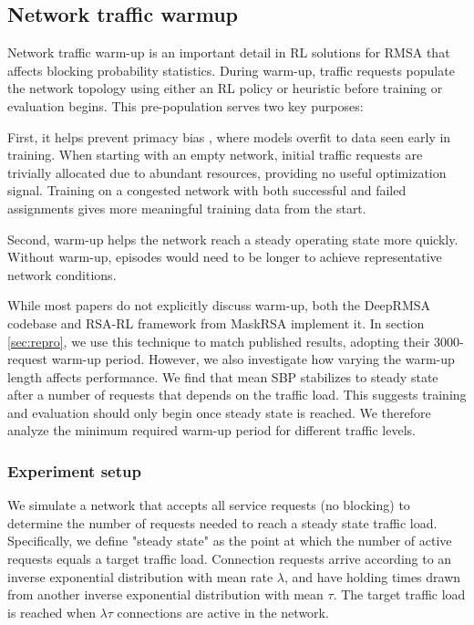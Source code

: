 \subsection{Network traffic warmup}
\label{sec:warmup}

Network traffic warm-up is an important detail in RL solutions for RMSA that affects blocking probability statistics. During warm-up, traffic requests populate the network topology using either an RL policy or heuristic before training or evaluation begins. This pre-population serves two key purposes:

First, it helps prevent primacy bias \cite{nikishin_primacy_2022}, where models overfit to data seen early in training. When starting with an empty network, initial traffic requests are trivially allocated due to abundant resources, providing no useful optimization signal. Training on a congested network with both successful and failed assignments gives more meaningful training data from the start.

Second, warm-up helps the network reach a steady operating state more quickly. Without warm-up, episodes would need to be longer to achieve representative network conditions.

While most papers do not explicitly discuss warm-up, both the DeepRMSA codebase and RSA-RL framework from MaskRSA implement it. In section \ref{sec:repro}, we use this technique to match published results, adopting their 3000-request warm-up period. However, we also investigate how varying the warm-up length affects performance. We find that mean SBP stabilizes to steady state after a number of requests that depends on the traffic load. This suggests training and evaluation should only begin once steady state is reached. We therefore analyze the minimum required warm-up period for different traffic levels.

\subsubsection{Experiment setup}

We simulate a network that accepts all service requests (no blocking) to determine the number of requests needed to reach a steady state traffic load. Specifically, we define "steady state" as the point at which the number of active requests equals a target traffic load. Connection requests arrive according to an inverse exponential distribution with mean rate $\lambda$, and have holding times drawn from another inverse exponential distribution with mean $\tau$. The target traffic load is reached when $\lambda \tau$ connections are active in the network.

